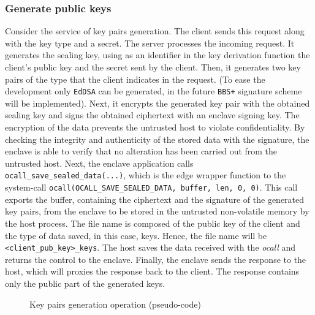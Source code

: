 \subsubsection{Generate public keys}
Consider the service of key pairs generation. The client sends this request along with the key type and a secret. The server processes the incoming request. It generates the sealing key, using as an identifier in the key derivation function the client's public key and the secret sent by the client. Then, it generates two key pairs of the type that the client indicates in the request. (To ease the development only \texttt{EdDSA} can be generated, in the future \texttt{BBS+} signature scheme will be implemented). 
Next, it encrypts the generated key pair with the obtained sealing key and signs the obtained ciphertext with an enclave signing key. 
The encryption of the data prevents the untrusted host to violate confidentiality.
By checking the integrity and authenticity of the stored data with the signature, the enclave is able to verify that no alteration has been carried out from the untrusted host.
Next, the enclave application calls \texttt{ocall\_save\_sealed\_data(...)}, which is the edge wrapper function to the system-call \texttt{ocall(OCALL\_SAVE\_SEALED\_DATA, buffer, len, 0, 0)}. This call exports the buffer, containing the ciphertext and the signature of the generated key pairs, from the enclave to be stored in the untrusted non-volatile memory by the host process. The file name is composed of the public key of the client and the type of data saved, in this case, keys. Hence, the file name will be \texttt{<client\_pub\_key>\_keys}. 
The host saves the data received with the \textit{ocall} and returns the control to the enclave. 
Finally, the enclave sends the response to the host, which will proxies the response back to the client. The response contains only the public part of the generated keys. \\

\begin{figure}[H]
    \centering
    
    \caption{Key pairs generation operation (pseudo-code)}
    \label{poc-gen-keys}
\end{figure}

